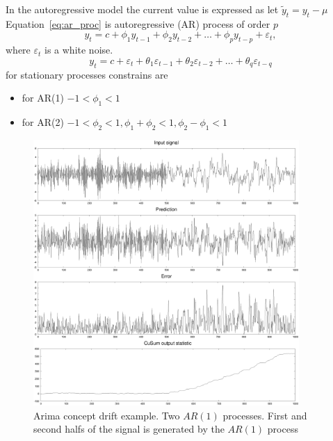 \documentclass[doctoral,utf8,lot,loar,lof,shortloft,index]{jydiss}
\begin{document}
In the autoregressive model
the current value is expressed as 
let $\tilde{y}_t = y_t - \mu$
Equation~\ref{eq:ar_proc} is autoregressive (AR) process of order $p$
\begin{equation}\label{eq:ar_proc}
  y_{t} = c + \phi_{1}y_{t-1} + \phi_{2}y_{t-2} + \dots + \phi_{p}y_{t-p} + \varepsilon_{t},
\end{equation}
where $\varepsilon_{t}$ is a white noise. 
\begin{equation}\label{eq:ma_proc}
  y_{t} = c + \varepsilon_t + \theta_{1}\varepsilon_{t-1} + \theta_{2}\varepsilon_{t-2} + \dots + \theta_{q}\varepsilon_{t-q}
\end{equation}
for stationary processes constrains are~\cite{hyndman2018forecasting} 
\begin{itemize}
  \item for AR(1) $-1 < \phi_1 < 1$
  \item for AR(2) $-1 < \phi_2 < 1, \phi_1+\phi_2 <1, \phi_2-\phi_1 < 1$
\end{itemize}
\begin{figure}[!htb]
	\centering
	\includegraphics[width=0.9\textwidth]{images/arima_cd_example}
	\caption{Arima concept drift example.
		Two $AR(1) $ processes.
		First and second halfs of the signal is generated by the $AR(1)$ process
	}\label{fig:arima_cd_example}
\end{figure}
\end{document}
